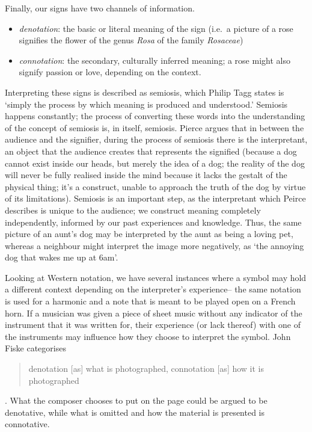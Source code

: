 Finally, our signs have two channels of information.
\begin{itemize}
\item \emph{\gls{denotation}}: the basic or literal meaning of the sign (i.e.\ a picture of a rose signifies the flower of the genus \emph{Rosa} of the family \emph{Rosaceae})
\item \emph{\gls{connotation}}: the secondary, culturally inferred meaning; a rose might also signify passion or love, depending on the context.
\end{itemize}

Interpreting these signs is described as semiosis, which Philip Tagg states is `simply the process by which meaning is produced and understood.'\autocite[156]{taggMusicMeaningsModern2013}
Semiosis happens constantly; the process of converting these words into the understanding of the concept of semiosis is, in itself, semiosis. 
Pierce argues that in between the audience and the signifier, during the process of semiosis there is the interpretant, an object that the audience creates that represents the signified (because a dog cannot exist inside our heads, but merely the idea of a dog; the reality of the dog will never be fully realised inside the mind because it lacks the gestalt of the physical thing; 
it's a construct, unable to approach the truth of the dog by virtue of its limitations).\autocite[]{pierce}
Semiosis is an important step, as the interpretant which Peirce describes is unique to the audience; we construct meaning completely independently, informed by our past experiences and knowledge.
Thus, the same picture of an aunt's dog may be interpreted by the aunt as being a loving pet, whereas a neighbour might interpret the image more negatively, as `the annoying dog that wakes me up at 6am'.

Looking at Western notation, we have several instances where a symbol may hold a different context depending on the interpreter's experience-- 
the same notation is used for a harmonic and a note that is meant to be played open on a French horn.\autocite[]{schuilingNotationCulturesEthnomusicology2019}
If a musician was given a piece of sheet music without any indicator of the instrument that it was written for, their experience (or lack thereof) with one of the instruments may influence how they choose to interpret the symbol.
John Fiske categorises \begin{quotation}
    denotation [as] what is photographed, connotation [as] how it is photographed
\end{quotation}.\autocite[91]{fiskeIntroductionCommunicationStudies2011}
What the composer chooses to put on the page could be argued to be denotative, while what is omitted and how the material is presented is connotative.

